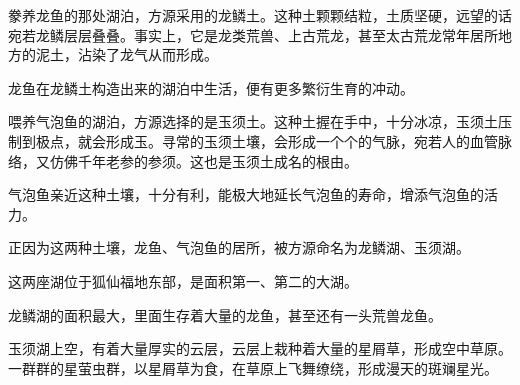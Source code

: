 \begin{this_body}
豢养龙鱼的那处湖泊，方源采用的龙鳞土。这种土颗颗结粒，土质坚硬，远望的话宛若龙鳞层层叠叠。事实上，它是龙类荒兽、上古荒龙，甚至太古荒龙常年居所地方的泥土，沾染了龙气从而形成。

龙鱼在龙鳞土构造出来的湖泊中生活，便有更多繁衍生育的冲动。

喂养气泡鱼的湖泊，方源选择的是玉须土。这种土握在手中，十分冰凉，玉须土压制到极点，就会形成玉。寻常的玉须土壤，会形成一个个的气脉，宛若人的血管脉络，又仿佛千年老参的参须。这也是玉须土成名的根由。

气泡鱼亲近这种土壤，十分有利，能极大地延长气泡鱼的寿命，增添气泡鱼的活力。

正因为这两种土壤，龙鱼、气泡鱼的居所，被方源命名为龙鳞湖、玉须湖。

这两座湖位于狐仙福地东部，是面积第一、第二的大湖。

龙鳞湖的面积最大，里面生存着大量的龙鱼，甚至还有一头荒兽龙鱼。

玉须湖上空，有着大量厚实的云层，云层上栽种着大量的星屑草，形成空中草原。一群群的星萤虫群，以星屑草为食，在草原上飞舞缭绕，形成漫天的斑斓星光。

\end{this_body}

